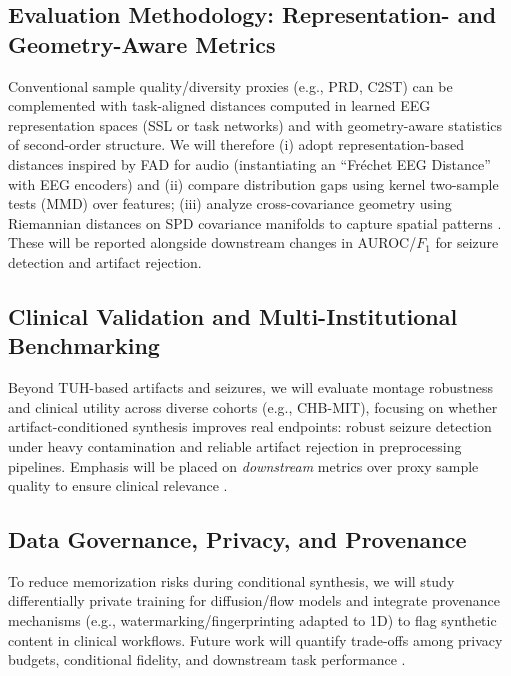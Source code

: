 \documentclass{article}
\begin{document}
\subsection{Evaluation Methodology: Representation- and Geometry-Aware Metrics}
Conventional sample quality/diversity proxies (e.g., PRD, C2ST) can be complemented with task-aligned distances computed in learned EEG representation spaces (SSL or task networks) and with geometry-aware statistics of second-order structure. We will therefore (i) adopt representation-based distances inspired by FAD for audio (instantiating an ``Fréchet EEG Distance'' with EEG encoders) and (ii) compare distribution gaps using kernel two-sample tests (MMD) over features; (iii) analyze cross-covariance geometry using Riemannian distances on SPD covariance manifolds to capture spatial patterns \citep{banville2021ssl,kilgour2019fad,gretton2012mmd,barachant2013riemannian}. These will be reported alongside downstream changes in AUROC/$F_1$ for seizure detection and artifact rejection.

\subsection{Clinical Validation and Multi-Institutional Benchmarking}
Beyond TUH-based artifacts and seizures, we will evaluate montage robustness and clinical utility across diverse cohorts (e.g., CHB-MIT), focusing on whether artifact-conditioned synthesis improves real endpoints: robust seizure detection under heavy contamination and reliable artifact rejection in preprocessing pipelines. Emphasis will be placed on \emph{downstream} metrics over proxy sample quality to ensure clinical relevance \citep{obeid2016tueg,goldberger2000physionet}.

\subsection{Data Governance, Privacy, and Provenance}
To reduce memorization risks during conditional synthesis, we will study differentially private training for diffusion/flow models and integrate provenance mechanisms (e.g., watermarking/fingerprinting adapted to 1D) to flag synthetic content in clinical workflows. Future work will quantify trade-offs among privacy budgets, conditional fidelity, and downstream task performance \citep{dockhorn2022dpdm,wen2023treering}.


\end{document}
